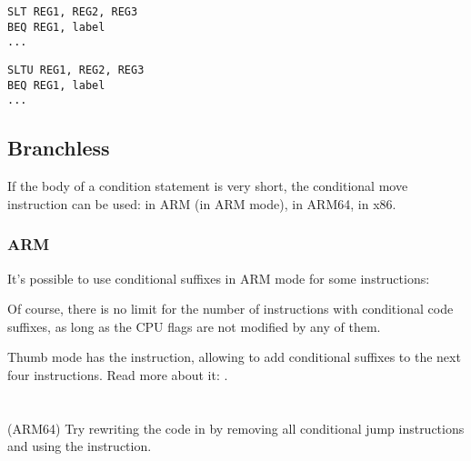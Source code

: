 \begin{lstlisting}[caption=Check for less than{,} greater than (signed)]
SLT REG1, REG2, REG3
BEQ REG1, label
...
\end{lstlisting}

\begin{lstlisting}[caption=Check for less than{,} greater than (unsigned)]
SLTU REG1, REG2, REG3
BEQ REG1, label
...
\end{lstlisting}
\fi

\subsection{Branchless}

If the body of a condition statement is very short, the conditional move instruction can be used: 
 in ARM (in ARM mode),  in ARM64,  in x86.

\ifdefined\IncludeARM
\subsubsection{ARM}

It's possible to use conditional suffixes in ARM mode for some instructions:



Of course, there is no limit for the number of instructions with conditional code suffixes, 
as long as the CPU flags are not modified by any of them.


Thumb mode has the  instruction, allowing to add conditional suffixes to the next four instructions.
Read more about it: .


\fi

\ifdefined\IncludeExercises
\section{\Exercise}

(ARM64) Try rewriting the code in  by removing all 
conditional jump instructions and using the  instruction.
\fi


